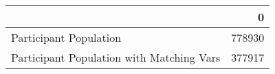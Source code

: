 \begin{tabular}{lr}
\toprule
{} &       0 \\
\midrule
Participant Population                    &  778930 \\
Participant Population with Matching Vars &  377917 \\
\bottomrule
\end{tabular}
